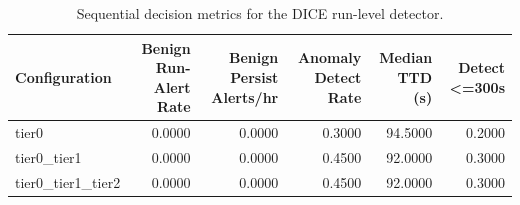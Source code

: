 \begin{table}[t]
\centering
\caption{Sequential decision metrics for the DICE run-level detector.}
\label{tab:dice_sequential_metrics}
\footnotesize
\begin{tabular}{lrrrrr}
\toprule
Configuration & Benign Run-Alert Rate & Benign Persist Alerts/hr & Anomaly Detect Rate & Median TTD (s) & Detect <=300s \\
\midrule
tier0 & 0.0000 & 0.0000 & 0.3000 & 94.5000 & 0.2000 \\
tier0_tier1 & 0.0000 & 0.0000 & 0.4500 & 92.0000 & 0.3000 \\
tier0_tier1_tier2 & 0.0000 & 0.0000 & 0.4500 & 92.0000 & 0.3000 \\
\bottomrule
\end{tabular}

\end{table}
